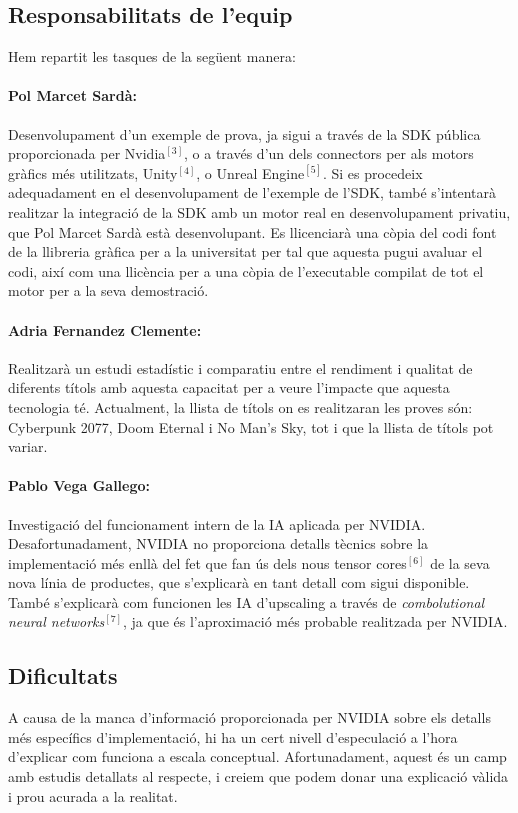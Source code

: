 \documentclass[a4paper]{article}
\begin{document}
\subsection{Responsabilitats de l'equip}
Hem repartit les tasques de la següent manera:

\paragraph{Pol Marcet Sardà:} Desenvolupament d'un exemple de prova, ja sigui a través de la SDK pública proporcionada per Nvidia$^{[3]}$, o a través d'un dels connectors per als motors gràfics més utilitzats, Unity$^{[4]}$, o Unreal Engine$^{[5]}$. Si es procedeix adequadament en el desenvolupament de l'exemple de l'SDK, també s'intentarà realitzar la integració de la SDK amb un motor real en desenvolupament privatiu, que Pol Marcet Sardà està desenvolupant. Es llicenciarà una còpia del codi font de la llibreria gràfica per a la universitat per tal que aquesta pugui avaluar el codi, així com una llicència per a una còpia de l'executable compilat de tot el motor per a la seva demostració.

\paragraph{Adria Fernandez Clemente:} Realitzarà un estudi estadístic i comparatiu entre el rendiment i qualitat de diferents títols amb aquesta capacitat per a veure l'impacte que aquesta tecnologia té. Actualment, la llista de títols on es realitzaran les proves són: Cyberpunk 2077, Doom Eternal i No Man's Sky, tot i que la llista de títols pot variar.

\paragraph{Pablo Vega Gallego:} Investigació del funcionament intern de la IA aplicada per NVIDIA. Desafortunadament, NVIDIA no proporciona detalls tècnics sobre la implementació més enllà del fet que fan ús dels nous tensor cores$^{[6]}$ de la seva nova línia de productes, que s'explicarà en tant detall com sigui disponible. També s'explicarà com funcionen les IA d'upscaling a través de \emph{combolutional neural networks}$^{[7]}$, ja que és l'aproximació més probable realitzada per NVIDIA.

\subsection{Dificultats}
A causa de la manca d'informació proporcionada per NVIDIA sobre els detalls més específics d'implementació, hi ha un cert nivell d'especulació a l'hora d'explicar com funciona a escala conceptual. Afortunadament, aquest és un camp amb estudis detallats al respecte, i creiem que podem donar una explicació vàlida i prou acurada a la realitat.\\
\end{document}
